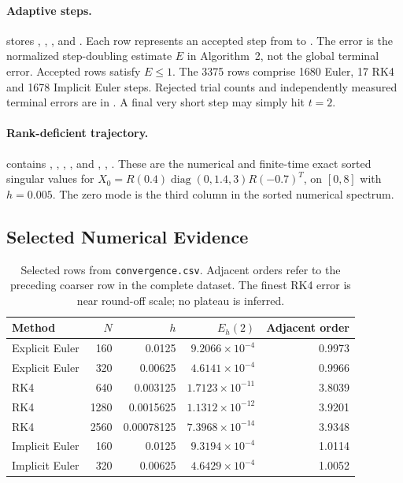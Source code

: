\paragraph{Adaptive steps.}
 stores , ,
, and . Each row represents an
accepted step from  to .
The error is the normalized step-doubling estimate $E$ in Algorithm~2,
not the global terminal error. Accepted rows satisfy $E\leq1$.
The 3375 rows comprise 1680 Euler, 17 RK4 and 1678 Implicit Euler steps.
Rejected trial counts and independently measured terminal errors are
in . A final very short step may simply hit $t=2$.

\paragraph{Rank-deficient trajectory.}
 contains ,
, , , and
, , .
These are the numerical and finite-time exact sorted singular values
for $X_0=R(0.4)\operatorname{diag}(0,1.4,3)R(-0.7)^T$,
on $[0,8]$ with $h=0.005$.
The zero mode is the third column in the sorted numerical spectrum.

\par\endgroup
\subsection{Selected Numerical Evidence}
\begin{table}[H]
\centering
\small
\begin{tabular}{lrrrr}
\toprule
Method & $N$ & $h$ & $E_h(2)$ & Adjacent order \\
\midrule
Explicit Euler & 160 & 0.0125 & $9.2066\times10^{-4}$ & 0.9973 \\
Explicit Euler & 320 & 0.00625 & $4.6141\times10^{-4}$ & 0.9966 \\
RK4 & 640 & 0.003125 & $1.7123\times10^{-11}$ & 3.8039 \\
RK4 & 1280 & 0.0015625 & $1.1312\times10^{-12}$ & 3.9201 \\
RK4 & 2560 & 0.00078125 & $7.3968\times10^{-14}$ & 3.9348 \\
Implicit Euler & 160 & 0.0125 & $9.3194\times10^{-4}$ & 1.0114 \\
Implicit Euler & 320 & 0.00625 & $4.6429\times10^{-4}$ & 1.0052 \\
\bottomrule
\end{tabular}
\caption{Selected rows from \texttt{convergence.csv}. Adjacent orders
refer to the preceding coarser row in the complete dataset.
The finest RK4 error is near round-off scale; no plateau is inferred.}
\label{tab:appendix_order_rows}
\end{table}

